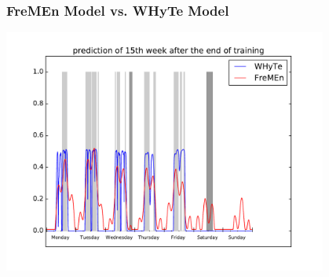 \begin{frame}
	\frametitle{FreMEn Model vs. WHyTe Model}
    \vspace{3mm}
            \includegraphics[width=0.8\textwidth]{fig/FreMEn_WHyTe.pdf}
\end{frame}




